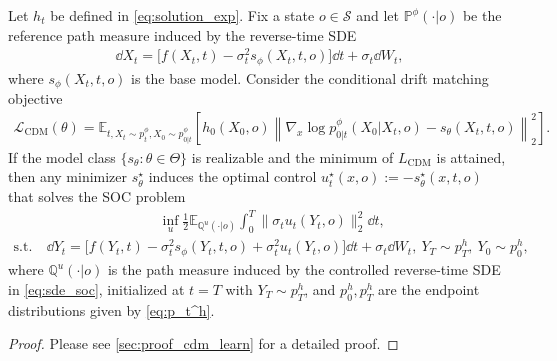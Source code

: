 \begin{proposition}
\label{prop:cdm_solves_soc}
Let $h_t$ be defined in \eqref{eq:solution_exp}.
Fix a state $o \in\mathcal S$ and let $\mathbb P^\phi(\cdot|o)$ be the reference path measure induced by the reverse-time SDE
\begin{align*}
    \dd X_t
    =
    \bigl[
        f(X_t,t)-\sigma_t^2 s_\phi(X_t,t,o)
    \bigr]\dd t
    +
    \sigma_t\dd W_t,
\end{align*}
where $s_\phi(X_t,t,o)$ is the base model.
Consider the conditional drift matching objective
\begin{align*}
\mathcal{L}_{\mathrm{CDM}}(\theta)
=
\mathbb E_{t, X_t\sim p_t^\phi, X_0\sim p_{0|t}^\phi}
\left[
h_0(X_0,o)
\left\|
\nabla_x\log p_{0|t}^\phi(X_0|X_t,o)
-
s_\theta(X_t,t,o)
\right\|_2^2
\right].
\end{align*}
If the model class $\{s_\theta : \theta \in \Theta\}$ is realizable and the minimum of $L_{\mathrm{CDM}}$ is attained, then any minimizer $s_\theta^\star$ induces the optimal control
$u_t^\star(x,o) := -s_\theta^\star(x,t,o)$
that solves the SOC problem
\begin{align}
    & ~ \quad \quad \quad
    \quad \quad \quad \quad \quad \inf_u
    \frac12
    \mathbb E_{\mathbb Q^u(\cdot|o)}
    \int_0^T
    \|\sigma_t
    u_t(Y_t,o)\|_2^2\dd t,
    \label{eq:oj_soc}
    \\
    \text{s.t.} & ~
    \dd Y_t
    =
    \bigl[
        f(Y_t,t)-\sigma_t^2 s_\phi(Y_t,t,o) + \sigma_t^2 u_t(Y_t,o)
    \bigr]\dd t
    +
    \sigma_t\dd W_t ,
    ~ Y_T \sim p_T^h, ~Y_0 \sim p_0^h,
    \label{eq:sde_soc}
\end{align}
where $\mathbb Q^u(\cdot|o)$ is the path measure induced by the controlled reverse-time SDE in \eqref{eq:sde_soc}, initialized at $t=T$ with $Y_T\sim p_T^h$, and $p_0^h,p_T^h$ are the endpoint distributions given by \eqref{eq:p_t^h}.
\end{proposition}

\begin{proof}
Please see \cref{sec:proof_cdm_learn} for a detailed proof.
\end{proof}

